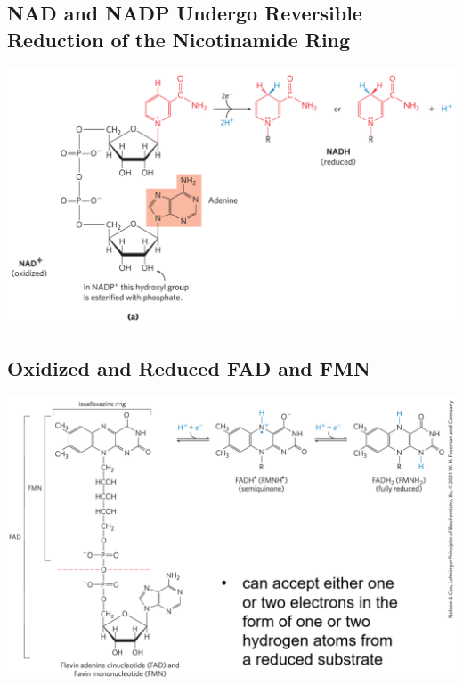 \documentclass[10pt]{article}
\begin{document}
\subsection*{NAD and NADP Undergo Reversible Reduction of the Nicotinamide Ring}
\begin{center} 
    \includegraphics*[width=\textwidth]{L3_13.png}
\end{center}

\subsection*{Oxidized and Reduced FAD and FMN}
\begin{center} 
	\includegraphics*[width=\textwidth]{L3_14.png}
\end{center}
\end{document}
